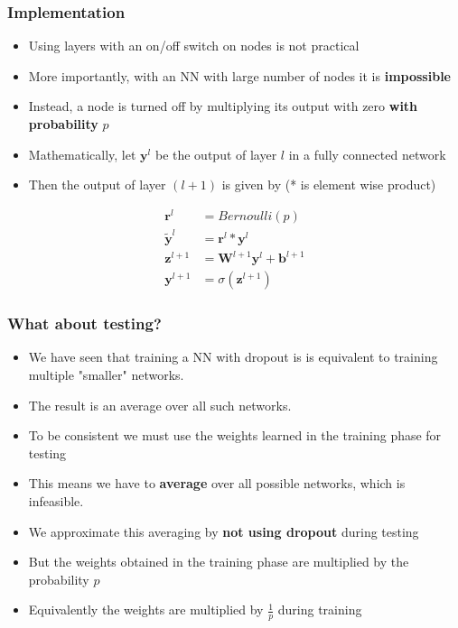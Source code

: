\documentclass{beamer}
\begin{document}
\begin{frame}
    \frametitle{Implementation}
\begin{itemize}
    \item Using layers with an on/off switch on nodes is not practical 
    \item More importantly, with an NN with large number of nodes it is \textbf{impossible}
    \item Instead, a node is turned off by multiplying its output with zero \textbf{with probability} $p$ 
    \item Mathematically, let $\mathbf{y}^{l}$ be the output of layer $l$ in a fully connected network
    \item Then the output of layer $(l+1)$ is given by  (* is element wise product)
\end{itemize}
    \begin{align*}
       \mathbf{r}^l&=Bernoulli(p)\\
        \mathbf{\tilde{y}}^l&=\mathbf{r}^l*\mathbf{y}^l\\
        \mathbf{z}^{l+1}&=\mathbf{W}^{l+1}\mathbf{y}^l+\mathbf{b}^{l+1}\\
        \mathbf{y}^{l+1}&=\sigma(\mathbf{z}^{l+1})
    \end{align*}

\end{frame}
\begin{frame}
    \frametitle{What about testing?}
    \begin{itemize}
        \item We have seen that training a NN with dropout is   is equivalent to training multiple "smaller" networks.
        \item The result is an average over all such networks.
        \item To be consistent we must use the weights learned in the training phase for testing
        \item This means we have to \textbf{average} over all possible networks, which is infeasible.
        \item We approximate this averaging by \textbf{not using dropout} during testing
        \item But the weights obtained in the training phase are multiplied by the probability $p$
        \item Equivalently the weights are multiplied by $\frac{1}{p}$ during training
    \end{itemize}
    

\end{frame}
\end{document}
